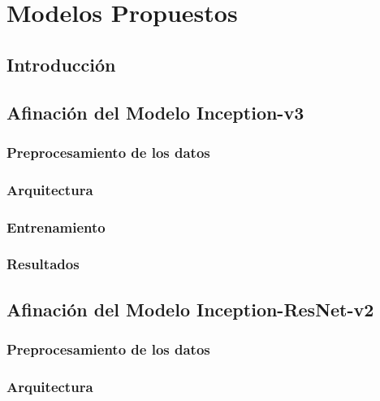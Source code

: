 \chapter{Modelos Propuestos} \label{Chapter:4}
\section{Introducción}

\section{Afinación del Modelo Inception-v3}
\subsection{Preprocesamiento de los datos}
\subsection{Arquitectura}


\subsection{Entrenamiento}

\subsection{Resultados}




\section{Afinación del Modelo Inception-ResNet-v2}

\subsection{Preprocesamiento de los datos}

\subsection{Arquitectura}


